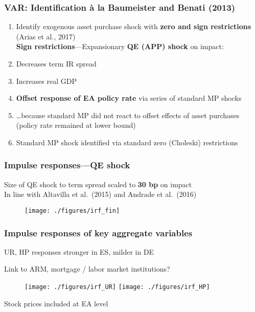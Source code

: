 \documentclass[pdflatex,aspectratio=169]{beamer}
\newcommand{\jbemph}[1]{\textbf{\color{SlideNavy}#1}}
\begin{document}
\begin{frame}\frametitle{\bf\large VAR: Identification \`a la Baumeister and Benati (2013)}
\begin{enumerate}
\setlength{\itemsep}{2mm}
\item Identify exogenous asset purchase shock with \jbemph{zero and sign restrictions} (Arias et al., 2017)\\[2mm]
\jbemph{Sign restrictions}---Expansionary \jbemph{QE (APP) shock} on impact:
\bi
\item Decreases term IR spread
\item Increases real GDP
\ei
\item \jbemph{Offset response of EA policy rate} via series of standard MP shocks
\bi
\item \dots because standard MP did not react to offset effects of asset purchases (policy rate remained at lower bound)
\ei
\item Standard MP shock identified via standard zero (Choleski) restrictions
\end{enumerate}

\end{frame}



\begin{frame}\frametitle{\bf Impulse responses---QE shock}
\bi
\item Size of QE shock to term spread scaled to \jbemph{30 bp} on impact\\
In line with Altavilla et al.\ (2015) and Andrade et al.\ (2016)
\ei
\begin{figure}
\begin{center}
\texttt{[image: ./figures/irf\_fin]} %
\end{center}
\end{figure}

\end{frame}



\begin{frame}\frametitle{\bf Impulse responses of key aggregate variables}
\bi
\item UR, HP responses stronger in ES, milder in DE
\item Link to ARM, mortgage / labor market institutions?
\ei
\begin{figure}
\begin{center}
\texttt{[image: ./figures/irf\_UR]}
\texttt{[image: ./figures/irf\_HP]}
\end{center}
\end{figure}
\bi
\item Stock prices included at EA level
\ei
\end{frame}
\end{document}
